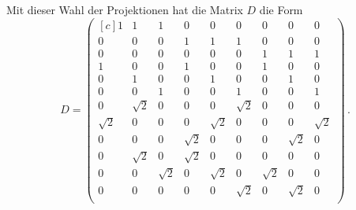 Mit dieser Wahl der Projektionen hat die Matrix $D$ die Form 
\begin{equation*}
    D = \begin{pmatrix*}[c]
        1 & 1 & 1 & 0 & 0 & 0 & 0 & 0 & 0 \\ %
        0 & 0 & 0 & 1 & 1 & 1 & 0 & 0 & 0 \\ %
        0 & 0 & 0 & 0 & 0 & 0 & 1 & 1 & 1 \\ %
        1 & 0 & 0 & 1 & 0 & 0 & 1 & 0 & 0 \\ %
        0 & 1 & 0 & 0 & 1 & 0 & 0 & 1 & 0 \\ %
        0 & 0 & 1 & 0 & 0 & 1 & 0 & 0 & 1 \\ %
        0 & \sqrt{2} & 0 & 0 & 0 & \sqrt{2} & 0 & 0 & 0 \\ %
        \sqrt{2} & 0 & 0 & 0 & \sqrt{2} & 0 & 0 & 0 & \sqrt{2} \\ %
        0 & 0 & 0 & \sqrt{2} & 0 & 0 & 0 & \sqrt{2} & 0 \\ %
        0 & \sqrt{2} & 0 & \sqrt{2} & 0 & 0 & 0 & 0 & 0 \\ %
        0 & 0 & \sqrt{2} & 0 & \sqrt{2} & 0 & \sqrt{2} & 0 & 0 \\ %
        0 & 0 & 0 & 0 & 0 & \sqrt{2} & 0 & \sqrt{2} & 0 \\ %
    \end{pmatrix*} \, .
\end{equation*}
